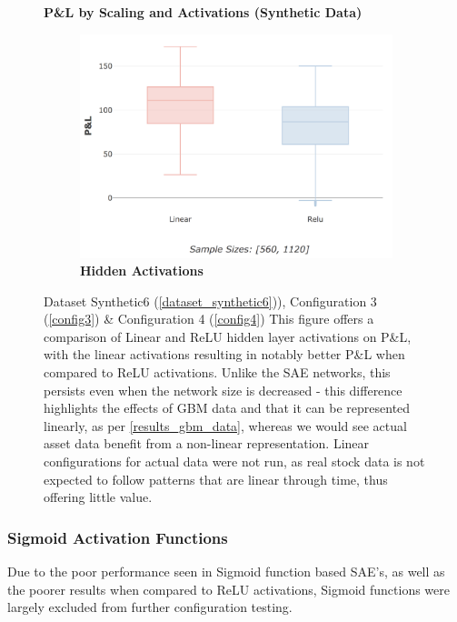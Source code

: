 \documentclass[a4paper,11pt,oneside]{article}
\theoremstyle{plain}
\theoremstyle{definition}
\begin{document}
	\begin{figure}[H]
		\centering
		\textbf{P\&L by Scaling and Activations (Synthetic Data)}

		\begin{subfigure}{.5\textwidth}
			\centering 
			\includegraphics[scale=0.25]{images/results/activations/synth_pl_hidden.png}
			\caption[P\&L by Scaling and Activations (Synthetic Data) - Hidden Activations]{\textbf{Hidden Activations} 
				\newline }
			\label{figure-synth_pl_hidden}
		\end{subfigure}
		\caption[P\&L by Scaling and Activations (Synthetic Data)]
		{Dataset Synthetic6  (\ref{dataset_synthetic6})), Configuration 3 (\ref{config3}) \& Configuration 4 (\ref{config4})
			\newline This figure offers a comparison of Linear and ReLU hidden layer activations on P\&L, with the linear activations resulting in notably better P\&L when compared to ReLU activations. Unlike the SAE networks, this persists even when the network size is decreased - this difference highlights the effects of GBM data and that it can be represented linearly, as per \ref{results_gbm_data}, whereas we would see actual asset data benefit from a non-linear representation. Linear configurations for actual data were not run, as real stock data is not expected to follow patterns that are linear through time, thus offering little value.}
		\label{figure-pl_activations_scaling}
	\end{figure}
	
	\subsubsection{Sigmoid Activation Functions} 
	Due to the poor performance seen in Sigmoid function based SAE's, as well as the poorer results when compared to ReLU activations, Sigmoid functions were largely excluded from further configuration testing.
	
\end{document}
